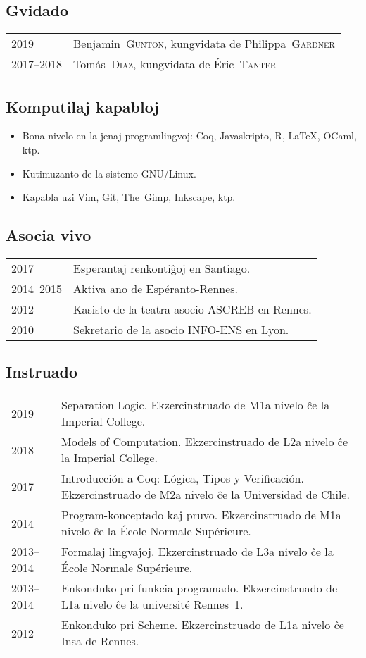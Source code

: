 \documentclass[12pt,a4paper]{article}
\makeatletter
\newcommand{\en}[1]{\foreignlanguage{english}{{#1}}}
\newcommand{\fr}[1]{\foreignlanguage{french}{{#1}}}
\newcommand{\es}[1]{\foreignlanguage{spanish}{{#1}}}
\newcommand{\en}[1]{\foreignlanguage{english}{{#1}}}
\newcommand{\fr}[1]{\foreignlanguage{french}{{#1}}}
\newcommand{\es}[1]{\foreignlanguage{spanish}{{#1}}}
\newenvironment{datecvsection}[1]%
               {\subsection*{#1}%
                 \noindent \begin{tabular}{@{}p{\annee}p{\texte}@{}}}
               {\end{tabular}}
\newenvironment{itemcvsection}[1]%
               {\subsection*{#1}\begin{itemize}}
               {\end{itemize}}
\newcommand\familyName{\textsc}
\newcommand\placeName{}
\makeatother
\begin{document}
\begin{datecvsection}{Gvidado}

    2019 & Benjamin~\familyName{Gunton}, kungvidata de Philippa~\familyName{Gardner} \\
    2017–2018 & Tomás~\familyName{Diaz}, kungvidata de Éric~\familyName{Tanter} \\

\end{datecvsection}

\begin{itemcvsection}{Komputilaj kapabloj}

  \item Bona nivelo en la jenaj programlingvoj:  Coq, Javaskripto, R, \LaTeX, OCaml, ktp.
  \item Kutimuzanto de la sistemo GNU/Linux.
  \item Kapabla uzi Vim, Git, The~Gimp, Inkscape, ktp.

\end{itemcvsection}

\begin{datecvsection}{Asocia vivo}

    2017 & Esperantaj renkontiĝoj en \placeName{Santiago}. \\
    2014–2015 & Aktiva ano de {Espéranto-Rennes}. \\
	2012 & Kasisto de la teatra asocio {ASCREB} en \placeName{Rennes}. \\
	2010 & Sekretario de la asocio \textsc{INFO-ENS} en \placeName{Lyon}.

\end{datecvsection}

\begin{datecvsection}{Instruado}

    2019 & Separation Logic. Ekzercinstruado de M1a nivelo ĉe la \en{\placeName{Imperial College}}. \\

    2018 & Models of Computation. Ekzercinstruado de L2a nivelo ĉe la \en{\placeName{Imperial College}}. \\

    2017 & Introducción a Coq: Lógica, Tipos y Verificación. Ekzercinstruado de M2a nivelo ĉe la \es{\placeName{Universidad de Chile}}. \\

    2014 & Program-konceptado kaj pruvo. Ekzercinstruado de M1a nivelo ĉe la \fr{\placeName{École Normale Supérieure}}. \\

    2013–2014 & Formalaj lingvaĵoj. Ekzercinstruado de L3a nivelo ĉe la \fr{\placeName{École Normale Supérieure}}. \\

    2013–2014 & Enkonduko pri funkcia programado. Ekzercinstruado de L1a nivelo ĉe la \fr{université \placeName{Rennes}~1}. \\

    2012 & Enkonduko pri Scheme. Ekzercinstruado de L1a nivelo ĉe \placeName{Insa} de \placeName{Rennes}. \\

\end{datecvsection}
\end{document}
